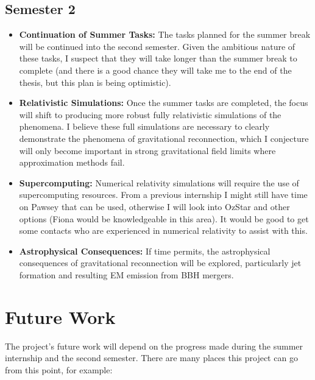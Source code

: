 \subsection{Semester 2}

\begin{itemize}
    \item \textbf{Continuation of Summer Tasks:} The tasks planned for the summer break will be continued into the second semester. Given the ambitious nature of these tasks, I suspect that they will take longer than the summer break to complete (and there is a good chance they will take me to the end of the thesis, but this plan is being optimistic).
    
    \item \textbf{Relativistic Simulations:} Once the summer tasks are completed, the focus will shift to producing more robust fully relativistic simulations of the phenomena. I believe these full simulations are necessary to clearly demonstrate the phenomena of gravitational reconnection, which I conjecture will only become important in strong gravitational field limits where approximation methods fail.
    
    \item \textbf{Supercomputing:} Numerical relativity simulations will require the use of supercomputing resources. From a previous internship I might still have time on Pawsey that can be used, otherwise I will look into OzStar and other options (Fiona would be knowledgeable in this area). It would be good to get some contacts who are experienced in numerical relativity to assist with this.
    
    \item \textbf{Astrophysical Consequences:} If time permits, the astrophysical consequences of gravitational reconnection will be explored, particularly jet formation and resulting EM emission from BBH mergers.
\end{itemize}

\section{Future Work}
The project's future work will depend on
the progress made during the summer internship and the second semester. There are many places this project can go from this point, for example:

